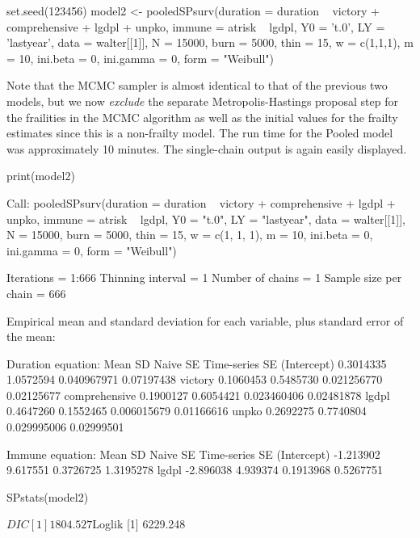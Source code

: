 \begin{example}
set.seed(123456)
model2 <- pooledSPsurv(duration = duration ~ victory + comprehensive + lgdpl + unpko,
                       immune = atrisk ~ lgdpl,
                       Y0 = 't.0',
                       LY = 'lastyear',
                       data = walter[[1]],
                       N = 15000,
                       burn = 5000,
                       thin = 15,
                       w = c(1,1,1),
                       m = 10,
                       ini.beta =  0,
                       ini.gamma = 0,
                       form = "Weibull")
\end{example}

\noindent Note that the MCMC sampler is almost identical to that of the previous two models, but we now \textit{exclude} the separate Metropolis-Hastings proposal step for the frailities in the MCMC algorithm as well as the initial values for the frailty estimates since this is a non-frailty model. The run time for the Pooled model was approximately 10 minutes. The single-chain output is again easily displayed.

\begin{example}
print(model2)

Call:
pooledSPsurv(duration = duration ~ victory + comprehensive + 
    lgdpl + unpko, immune = atrisk ~ lgdpl, Y0 = "t.0", 
    LY = "lastyear", data = walter[[1]], N = 15000, burn = 5000, 
    thin = 15, w = c(1, 1, 1), m = 10, ini.beta = 0, ini.gamma = 0, 
    form = "Weibull")


Iterations = 1:666
Thinning interval = 1 
Number of chains = 1 
Sample size per chain = 666 

Empirical mean and standard deviation for each variable,
plus standard error of the mean:


Duration equation: 
                   Mean        SD    Naive SE Time-series SE
(Intercept)   0.3014335 1.0572594 0.040967971     0.07197438
victory       0.1060453 0.5485730 0.021256770     0.02125677
comprehensive 0.1900127 0.6054421 0.023460406     0.02481878
lgdpl         0.4647260 0.1552465 0.006015679     0.01166616
unpko         0.2692275 0.7740804 0.029995006     0.02999501

Immune equation: 
                 Mean       SD  Naive SE Time-series SE
(Intercept) -1.213902 9.617551 0.3726725      1.3195278
lgdpl       -2.896038 4.939374 0.1913968      0.5267751


SPstats(model2)

$DIC
[1] 1804.527

$Loglik
[1] 6229.248
\end{example}

